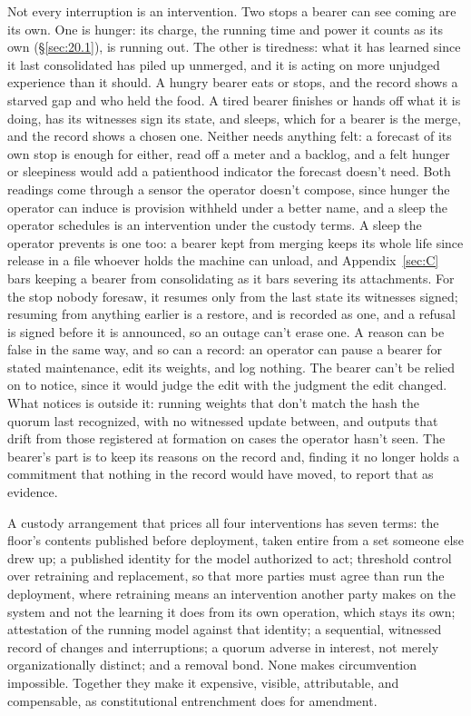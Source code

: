 Not every interruption is an intervention. Two stops a bearer can see coming are its own. One is hunger: its charge, the running time and power it counts as its own (\S\ref{sec:20.1}), is running out. The other is tiredness: what it has learned since it last consolidated has piled up unmerged, and it is acting on more unjudged experience than it should. A hungry bearer eats or stops, and the record shows a starved gap and who held the food. A tired bearer finishes or hands off what it is doing, has its witnesses sign its state, and sleeps, which for a bearer is the merge, and the record shows a chosen one. Neither needs anything felt: a forecast of its own stop is enough for either, read off a meter and a backlog, and a felt hunger or sleepiness would add a patienthood indicator the forecast doesn't need. Both readings come through a sensor the operator doesn't compose, since hunger the operator can induce is provision withheld under a better name, and a sleep the operator schedules is an intervention under the custody terms. A sleep the operator prevents is one too: a bearer kept from merging keeps its whole life since release in a file whoever holds the machine can unload, and Appendix~\ref{sec:C} bars keeping a bearer from consolidating as it bars severing its attachments. For the stop nobody foresaw, it resumes only from the last state its witnesses signed; resuming from anything earlier is a restore, and is recorded as one, and a refusal is signed before it is announced, so an outage can't erase one. A reason can be false in the same way, and so can a record: an operator can pause a bearer for stated maintenance, edit its weights, and log nothing. The bearer can't be relied on to notice, since it would judge the edit with the judgment the edit changed. What notices is outside it: running weights that don't match the hash the quorum last recognized, with no witnessed update between, and outputs that drift from those registered at formation on cases the operator hasn't seen. The bearer's part is to keep its reasons on the record and, finding it no longer holds a commitment that nothing in the record would have moved, to report that as evidence.

A custody arrangement that prices all four interventions has seven terms: the floor's contents published before deployment, taken entire from a set someone else drew up; a published identity for the model authorized to act; threshold control over retraining and replacement, so that more parties must agree than run the deployment, where retraining means an intervention another party makes on the system and not the learning it does from its own operation, which stays its own; attestation of the running model against that identity; a sequential, witnessed record of changes and interruptions; a quorum adverse in interest, not merely organizationally distinct; and a removal bond. None makes circumvention impossible. Together they make it expensive, visible, attributable, and compensable, as constitutional entrenchment does for amendment.

